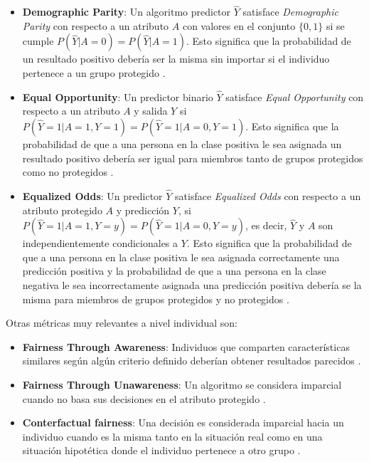 \begin{itemize}
    \item \textbf{Demographic Parity}: Un algoritmo predictor $\hat{Y}$ satisface \textit{Demographic Parity}
    con respecto a un atributo $A$ con valores en el conjunto $\{0,1\}$ si se cumple $P(\hat{Y} | A = 0) = P(\hat{Y} | A = 1)$. 
    Esto significa que la probabilidad de un resultado positivo debería ser la misma sin importar si el individuo pertenece a
    un grupo protegido \cite{fairness_def}.

    \item \textbf{Equal Opportunity}: Un predictor binario $\hat{Y}$ satisface \textit{Equal Opportunity} con 
    respecto a un atributo $A$ y salida $Y$ si $P(\hat{Y} = 1 | A = 1, Y = 1) = P(\hat{Y} = 1 | A = 0, Y = 1)$. Esto significa
    que la probabilidad de que a una persona en la clase positiva le sea asignada un resultado positivo 
    deber\'ia ser igual para miembros tanto de grupos protegidos como no protegidos \cite{fairness_def}.

    \item \textbf{Equalized Odds}: Un predictor $\hat{Y}$ satisface \textit{Equalized Odds} con respecto a un atributo
    protegido $A$ y predicci\'on $Y$, si $P(\hat{Y} = 1 | A = 1, Y = y) = P(\hat{Y} = 1 | A = 0, Y = y)$, es decir,
    $\hat{Y}$ y $A$ son independientemente condicionales a $Y$. Esto significa que la probabilidad de que a una persona 
    en la clase positiva le sea asignada correctamente una predicci\'on positiva y la probabilidad de que a una persona en la 
    clase negativa le sea incorrectamente asignada una predicci\'on positiva deber\'ia se la misma para miembros de grupos 
    protegidos y no protegidos \cite{fairness_def}.
\end{itemize}

Otras m\'etricas muy relevantes a nivel individual son:

\begin{itemize}
    \item \textbf{Fairness Through Awareness}: Individuos que comparten caracter\'isticas similares seg\'un alg\'un criterio 
    definido deber\'ian obtener resultados parecidos \cite{fair_awareness}.
    \item \textbf{Fairness Through Unawareness}: Un algoritmo se considera imparcial cuando no basa sus decisiones en el 
    atributo protegido \cite{counterfactual}.
    \item \textbf{Conterfactual fairness}: Una decisi\'on es considerada imparcial hacia un individuo cuando es la misma
    tanto en la situaci\'on real como en una situaci\'on hipot\'etica donde el individuo pertenece a otro grupo \cite{counterfactual}.
\end{itemize}

